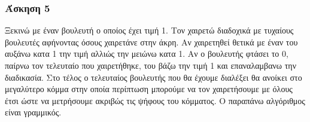 \newpage

\subsubsection*{Άσκηση 5}

Ξεκινώ με έναν βουλευτή ο οποίος έχει τιμή 1.
Τον χαιρετώ διαδοχικά με τυχαίους βουλευτές αφήνοντας όσους χαιρετάνε στην άκρη.
Αν χαιρετηθεί θετικά με έναν του αυξάνω κατα 1 την τιμή αλλιώς την μειώνω κατα 1.
Αν ο βουλευτής φτάσει το 0, παίρνω τον τελευταίο που χαιρετήθηκε, του βάζω την τιμή 1 και επαναλαμβανω την διαδικασία.
Στο τέλος ο τελευταίος βουλευτής που θα έχουμε διαλέξει θα ανοίκει στο μεγαλύτερο κόμμα στην οποία περίπτωση μπορούμε να τον χαιρετήσουμε 
με όλους έτσι ώστε να μετρήσουμε ακριβώς τις ψήφους του κόμματος. Ο παραπάνω αλγόριθμος είναι γραμμικός.


